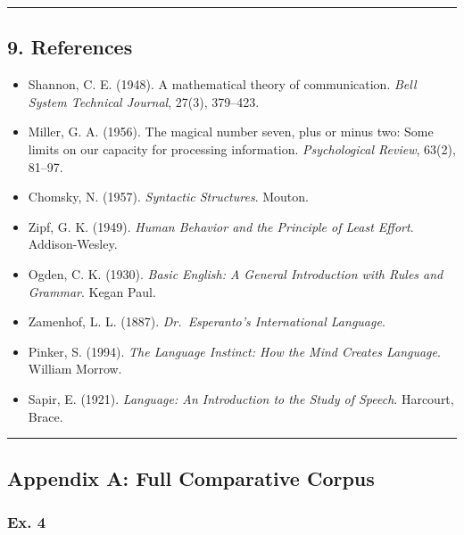 \begin{center}\rule{0.5\linewidth}{0.5pt}\end{center}

\newpage

\subsection{9. References}\label{references}

\begin{itemize}
\tightlist
\item
  Shannon, C. E. (1948). A mathematical theory of communication.
  \emph{Bell System Technical Journal}, 27(3), 379--423.
\item
  Miller, G. A. (1956). The magical number seven, plus or minus two:
  Some limits on our capacity for processing information.
  \emph{Psychological Review}, 63(2), 81--97.
\item
  Chomsky, N. (1957). \emph{Syntactic Structures}. Mouton.
\item
  Zipf, G. K. (1949). \emph{Human Behavior and the Principle of Least
  Effort}. Addison-Wesley.
\item
  Ogden, C. K. (1930). \emph{Basic English: A General Introduction with
  Rules and Grammar}. Kegan Paul.
\item
  Zamenhof, L. L. (1887). \emph{Dr.~Esperanto's International Language}.
\item
  Pinker, S. (1994). \emph{The Language Instinct: How the Mind Creates
  Language}. William Morrow.
\item
  Sapir, E. (1921). \emph{Language: An Introduction to the Study of
  Speech}. Harcourt, Brace.
\end{itemize}

\begin{center}\rule{0.5\linewidth}{0.5pt}\end{center}

\newpage

\subsection{Appendix A: Full Comparative
Corpus}\label{appendix-a-full-comparative-corpus}

\subsubsection{Ex. 4}\label{ex.-4}

\begin{Shaded}
\begin{Highlighting}[]
\end{Highlighting}
\end{Shaded}

